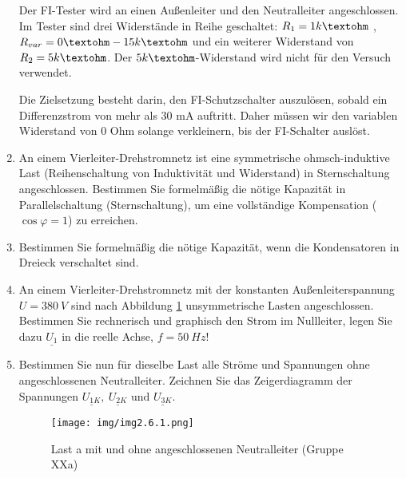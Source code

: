 \begin{enumerate}[label=\alph*)]
	Der FI-Tester wird an einen Außenleiter und den Neutralleiter angeschlossen. Im Tester sind drei Widerstände in Reihe geschaltet: $R_{1}=1k\textohm$ , $R_{var}=0\textohm - 15k\textohm$ und ein weiterer Widerstand von $R_{2}=5k\textohm$. Der $5k\textohm$-Widerstand wird nicht für den Versuch verwendet.
	\newpage
	{
	\renewcommand{\abstractname}{Herleitung zum FI-Tester}
	\begin{abstract}
	\end{abstract}
	}
	
	Die Zielsetzung besteht darin, den FI-Schutzschalter auszulösen, sobald ein Differenzstrom von mehr als 30 mA auftritt. Daher müssen wir den variablen Widerstand von 0 Ohm solange verkleinern, bis der FI-Schalter auslöst.

  \item An einem Vierleiter-Drehstromnetz ist eine symmetrische ohmsch-induktive Last (Reihenschaltung von Induktivität und Widerstand) in Sternschaltung angeschlossen. Bestimmen Sie formelmäßig die nötige Kapazität in Parallelschaltung (Sternschaltung), um eine vollständige Kompensation ($\cos \varphi = 1$) zu erreichen. 

  \item Bestimmen Sie formelmäßig die nötige Kapazität, wenn die Kondensatoren in Dreieck verschaltet sind.

  \item An einem Vierleiter-Drehstromnetz mit der konstanten Außenleiterspannung $U = 380\ V$ sind nach Abbildung \ref{img2.6.1} unsymmetrische Lasten angeschlossen. Bestimmen Sie rechnerisch und graphisch den Strom im Nullleiter, legen Sie dazu $\underline{U_1}$ in die reelle Achse, $f = 50\ Hz$!

\item Bestimmen Sie nun für dieselbe Last alle Ströme und Spannungen ohne angeschlossenen Neutralleiter. Zeichnen Sie das Zeigerdiagramm der Spannungen $\underline{U_{1K}},\ \underline{U_{2K}} \text{ und } \underline{U_{3K}}$. 
  \begin{figure}[h!]
    \begin{center}
      \texttt{[image: img/img2.6.1.png]}
    \end{center}
    \caption{Last a mit und ohne angeschlossenen Neutralleiter (Gruppe XXa)}\label{img2.6.1}
  \end{figure}
  
\end{enumerate}
